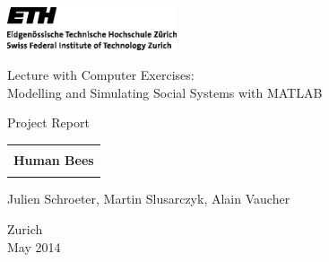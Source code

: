 
\thispagestyle{empty}

\begin{center}
\includegraphics[width=5cm]{ETHlogo.eps}

\bigskip


\bigskip


\bigskip


\LARGE{ 	Lecture with Computer Exercises:\\ }
\LARGE{ Modelling and Simulating Social Systems with MATLAB\\}

\bigskip

\bigskip

\small{Project Report}\\

\bigskip

\bigskip

\bigskip

\bigskip


\begin{tabular}{|c|}
\hline
\\
\textbf{\LARGE{Human Bees}}\\
\\
\hline
\end{tabular}
\bigskip

\bigskip

\bigskip

\LARGE{Julien Schroeter, Martin Slusarczyk, Alain Vaucher}



\bigskip

\bigskip

\bigskip

\bigskip

\bigskip

\bigskip

\bigskip

\bigskip

Zurich\\
May 2014\\

\end{center}


